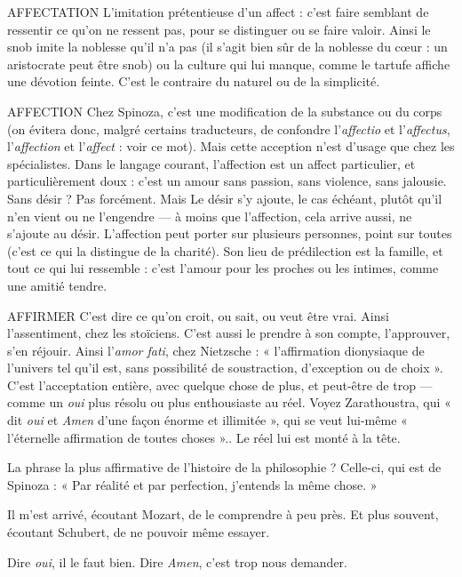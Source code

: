 AFFECTATION L’imitation prétentieuse d’un affect : c’est faire semblant de
ressentir ce qu'on ne ressent pas, pour se distinguer ou se
faire valoir. Ainsi le snob imite la noblesse qu’il n’a pas (il s’agit bien sûr de la
noblesse du cœur : un aristocrate peut être snob) ou la culture qui lui manque,
comme le tartufe affiche une dévotion feinte. C’est le contraire du naturel ou
de la simplicité.

AFFECTION Chez Spinoza, c’est une modification de la substance ou du
corps (on évitera donc, malgré certains traducteurs, de confondre
l’{\it affectio} et l’{\it affectus}, l'{\it affection} et l'{\it affect} : voir ce mot). Mais cette acception
n'est d'usage que chez les spécialistes. Dans le langage courant, l’affection est
un affect particulier, et particulièrement doux : c’est un amour sans passion,
sans violence, sans jalousie. Sans désir ? Pas forcément. Mais Le désir s’y ajoute,
le cas échéant, plutôt qu’il n’en vient ou ne l’engendre — à moins que l’affection,
cela arrive aussi, ne s'ajoute au désir.
L’affection peut porter sur plusieurs personnes, point sur toutes (c’est ce
qui la distingue de la charité). Son lieu de prédilection est la famille, et tout ce
qui lui ressemble : c’est l'amour pour les proches ou les intimes, comme une
amitié tendre.

AFFIRMER C'est dire ce qu’on croit, ou sait, ou veut être vrai. Ainsi l’assentiment,
chez les stoïciens. C’est aussi le prendre à son compte,
l’approuver, s’en réjouir. Ainsi l’{\it amor fati}, chez Nietzsche : « l'affirmation dionysiaque
de l’univers tel qu’il est, sans possibilité de soustraction, d'exception
ou de choix ». C’est l'acceptation entière, avec quelque chose de plus, et peut-être
de trop — comme un {\it oui} plus résolu ou plus enthousiaste au réel. Voyez
Zarathoustra, qui « dit {\it oui} et {\it Amen} d’une façon énorme et illimitée », qui se
veut lui-même « l’éternelle affirmation de toutes choses ».. Le réel lui est
monté à la tête.

La phrase la plus affirmative de l’histoire de la philosophie ? Celle-ci, qui
est de Spinoza : « Par réalité et par perfection, j'entends la même chose. »

Il m'est arrivé, écoutant Mozart, de le comprendre à peu près. Et plus souvent,
écoutant Schubert, de ne pouvoir même essayer.

Dire {\it oui}, il le faut bien. Dire {\it Amen}, c’est trop nous demander.


